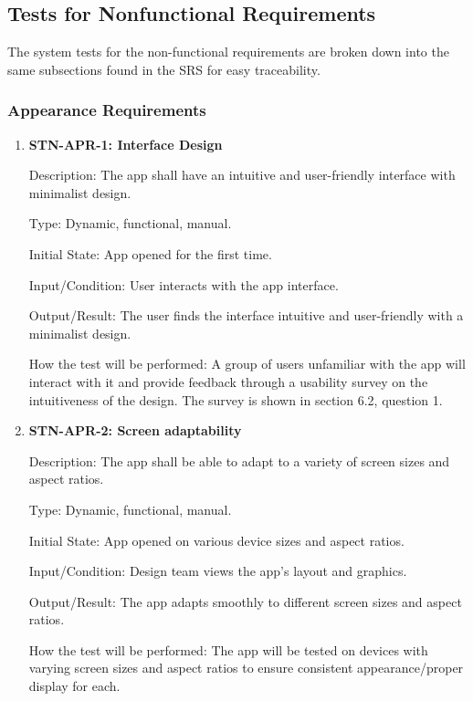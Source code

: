 \documentclass[12pt, titlepage]{article}
\begin{document}
    \subsection{Tests for Nonfunctional Requirements}

    The system tests for the non-functional requirements are broken down into the same subsections found in the SRS for easy traceability.

    \subsubsection{Appearance Requirements }

    \begin{enumerate}

        \item \textbf{STN-APR-1: Interface Design}

        Description: The app shall have an intuitive and user-friendly interface with minimalist design.

        Type: Dynamic, functional, manual.

        Initial State: App opened for the first time.

        Input/Condition: User interacts with the app interface.

        Output/Result: The user finds the interface intuitive and user-friendly with a minimalist design.

        How the test will be performed: A group of users unfamiliar with the app will interact with it and provide feedback through a usability survey on the intuitiveness of the design. The survey is shown in section 6.2, question 1.

        \item\textbf{STN-APR-2: Screen adaptability}

        Description: The app shall be able to adapt to a variety of screen sizes and aspect ratios.

        Type: Dynamic, functional, manual.

        Initial State: App opened on various device sizes and aspect ratios.

        Input/Condition: Design team views the app's layout and graphics.

        Output/Result: The app adapts smoothly to different screen sizes and aspect ratios.

        How the test will be performed: The app will be tested on devices with varying screen sizes and aspect ratios to ensure consistent appearance/proper display for each.



\end{enumerate}
\end{document}
